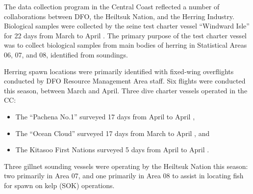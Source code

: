 The data collection program in the Central Coast reﬂected a number of collaborations between DFO, the Heiltsuk Nation, and the Herring Industry.
Biological samples were collected by the seine test charter vessel ``Windward Isle'' for 22 days from March 
to April .
The primary purpose of the test charter vessel was to collect biological samples from main bodies of herring in Statistical Areas 06, 07, and 08, identiﬁed from soundings.

Herring spawn locations were primarily identiﬁed with ﬁxed-wing overflights conducted by DFO Resource Management Area staff.
Six ﬂights were conducted this season, between March and April.
Three dive charter vessels operated in the CC:
\begin{itemize}
\item The ``Pachena No.1'' surveyed 17 days from April  to April ,
\item The ``Ocean Cloud'' surveyed 17 days from March  to April , and
\item The Kitasoo First Nations surveyed 5 days from April  to April .
\end{itemize}
Three gillnet sounding vessels were operating by the Heiltsuk Nation this season:
two primarily in Area 07, and one primarily in Area 08 to assist in locating fish for spawn on kelp (SOK) operations.